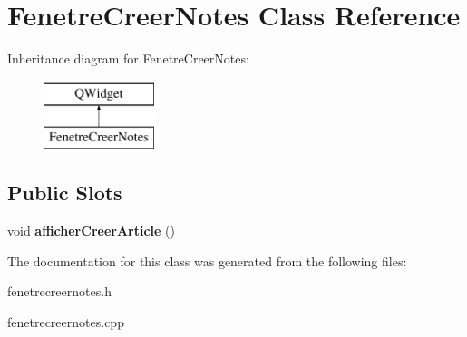 \hypertarget{class_fenetre_creer_notes}{}\section{Fenetre\+Creer\+Notes Class Reference}
\label{class_fenetre_creer_notes}
Inheritance diagram for Fenetre\+Creer\+Notes\+:\begin{figure}[H]
\begin{center}
\leavevmode
\includegraphics[height=2.000000cm]{class_fenetre_creer_notes}
\end{center}
\end{figure}
\subsection*{Public Slots}
\begin{DoxyCompactItemize}
\item 
\mbox{\label{class_fenetre_creer_notes_a4bc656b9917df184e08a96592be01275}} 
void {\bfseries afficher\+Creer\+Article} ()
\end{DoxyCompactItemize}


The documentation for this class was generated from the following files\+:\begin{DoxyCompactItemize}
\item 
fenetrecreernotes.\+h\item 
fenetrecreernotes.\+cpp\end{DoxyCompactItemize}

